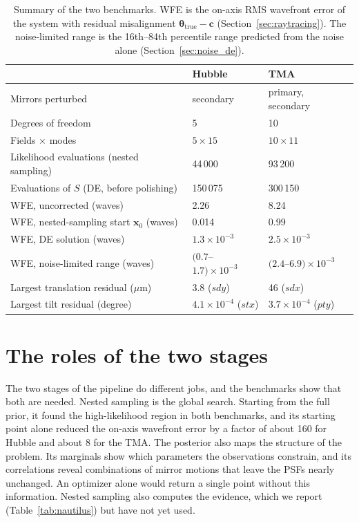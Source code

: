 \begin{table}
\centering
\caption[Summary of the two benchmarks.]{Summary of the two benchmarks. WFE is the on-axis RMS wavefront error of the system with residual misalignment $\boldsymbol{\theta}_{\mathrm{true}}-\mathbf{c}$ (Section~\ref{sec:raytracing}). The noise-limited range is the 16th--84th percentile range predicted from the noise alone (Section~\ref{sec:noise_de}).}
\label{tab:conc_summary}
\begin{tabular}{lll}
\hline
 & \textbf{Hubble} & \textbf{TMA} \\
\hline
Mirrors perturbed & secondary & primary, secondary \\
Degrees of freedom & 5 & 10 \\
Fields $\times$ modes & $5\times15$ & $10\times11$ \\
Likelihood evaluations (nested sampling) & 44\,000 & 93\,200 \\
Evaluations of $S$ (DE, before polishing) & 150\,075 & 300\,150 \\
WFE, uncorrected (waves) & 2.26 & 8.24 \\
WFE, nested-sampling start $\mathbf{x}_0$ (waves) & 0.014 & 0.99 \\
WFE, DE solution (waves) & $1.3\times10^{-3}$ & $2.5\times10^{-3}$ \\
WFE, noise-limited range (waves) & $(0.7$--$1.7)\times10^{-3}$ & $(2.4$--$6.9)\times10^{-3}$ \\
Largest translation residual ($\mu$m) & 3.8 ($sdy$) & 46 ($sdx$) \\
Largest tilt residual (degree) & $4.1\times10^{-4}$ ($stx$) & $3.7\times10^{-4}$ ($pty$) \\
\hline
\end{tabular}
\end{table}

\section{The roles of the two stages}\label{sec:conc_stages}

The two stages of the pipeline do different jobs, and the benchmarks show that both are needed. Nested sampling is the global search. Starting from the full prior, it found the high-likelihood region in both benchmarks, and its starting point alone reduced the on-axis wavefront error by a factor of about 160 for Hubble and about 8 for the TMA. The posterior also maps the structure of the problem. Its marginals show which parameters the observations constrain, and its correlations reveal combinations of mirror motions that leave the PSFs nearly unchanged. An optimizer alone would return a single point without this information. Nested sampling also computes the evidence, which we report (Table~\ref{tab:nautilus}) but have not yet used.

